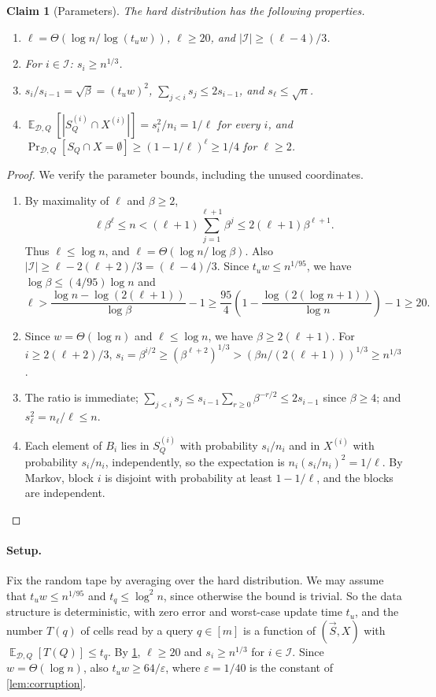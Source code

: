 \documentclass[11pt]{article}
\theoremstyle{plain}
\newtheorem{claim}[theorem]{Claim}
\theoremstyle{definition}
\theoremstyle{remark}
\newcommand{\eps}{\varepsilon}
\newcommand{\E}{\mathop{\mathbb{E}}}
\newcommand{\abs}[1]{\left|#1\right|}
\newcommand{\cI}{\mathcal{I}}
\newcommand{\cD}{\mathcal{D}}
\newcommand{\vS}{\vec{S}}
\begin{document}
\begin{claim}[Parameters]\label{clm:params}
The hard distribution has the following properties.
\begin{enumerate}[label=(\alph*)]
  \item $\ell = \Theta(\log n/\log(t_u w))$, $\ell \ge 20$, and $\abs{\cI} \ge (\ell - 4)/3$.
  \item For $i \in \cI$: $s_i \ge n^{1/3}$.
  \item $s_i/s_{i-1} = \sqrt\beta = (t_u w)^2$, $\sum_{j < i} s_j \le 2 s_{i-1}$, and $s_\ell \le \sqrt n$.
  \item $\E_{\cD,Q} \left[ \abs{S_Q^{(i)} \cap X^{(i)}} \right] = s_i^2/n_i = 1/\ell$ for every $i$, and $\Pr_{\cD,Q}[S_Q \cap X = \emptyset] \ge (1 - 1/\ell)^\ell \ge 1/4$ for $\ell \ge 2$.
\end{enumerate}
\end{claim}
\begin{proof}
We verify the parameter bounds, including the unused coordinates.
\begin{enumerate}[label=(\alph*), leftmargin=*]
  \item By maximality of $\ell$ and $\beta\ge2$,
  \[
  \ell\beta^\ell\le n < (\ell+1)\sum_{j=1}^{\ell+1}\beta^j
  \le 2(\ell+1)\beta^{\ell+1}.
  \]
  Thus $\ell\le\log n$, and $\ell=\Theta(\log n/\log\beta)$. Also $\abs{\cI}\ge \ell-2(\ell+2)/3=(\ell-4)/3$. Since $t_u w\le n^{1/95}$, we have $\log\beta\le(4/95)\log n$ and
  \[
  \ell > \frac{\log n-\log(2(\ell+1))}{\log\beta}-1
  \ge \frac{95}{4}\left(1-\frac{\log(2(\log n+1))}{\log n}\right)-1
  \ge20.
  \]
  \item Since $w=\Theta(\log n)$ and $\ell\le\log n$, we have $\beta\ge2(\ell+1)$. For $i\ge2(\ell+2)/3$, $s_i=\beta^{i/2}\ge(\beta^{\ell+2})^{1/3}>(\beta n/(2(\ell+1)))^{1/3}\ge n^{1/3}$.
  \item The ratio is immediate; $\sum_{j<i} s_j \le s_{i-1}\sum_{r \ge 0} \beta^{-r/2} \le 2 s_{i-1}$ since $\beta \ge 4$; and $s_\ell^2 = n_\ell/\ell \le n$.
  \item Each element of $B_i$ lies in $S_Q^{(i)}$ with probability $s_i/n_i$ and in $X^{(i)}$ with probability $s_i/n_i$, independently, so the expectation is $n_i (s_i/n_i)^2 = 1/\ell$. By Markov, block $i$ is disjoint with probability at least $1 - 1/\ell$, and the blocks are independent. \qedhere
\end{enumerate}
\end{proof}

\paragraph{Setup.}
Fix the random tape by averaging over the hard distribution. We may assume that $t_u w \le n^{1/95}$ and $t_q \le \log^2 n$, since otherwise the bound is trivial. So the data structure is deterministic, with zero error and worst-case update time $t_u$, and the number $T(q)$ of cells read by a query $q \in [m]$ is a function of $(\vS, X)$ with $\E_{\cD,Q}[T(Q)] \le t_q$. By \cref{clm:params}, $\ell \ge 20$ and $s_i \ge n^{1/3}$ for $i \in \cI$. Since $w = \Theta(\log n)$, also $t_u w \ge 64/\eps$, where $\eps = 1/40$ is the constant of \cref{lem:corruption}.
\end{document}
